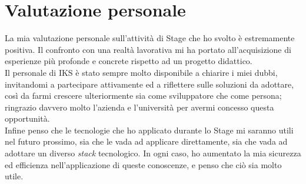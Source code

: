 \section{Valutazione personale}
La mia valutazione personale sull'attività di Stage che ho svolto è estremamente positiva. Il confronto con una realtà lavorativa mi ha portato all'acquisizione di esperienze più profonde e concrete rispetto ad un progetto didattico.\\
Il personale di IKS è stato sempre molto disponibile a chiarire i miei dubbi, invitandomi a partecipare attivamente ed a riflettere sulle soluzioni da adottare, così da farmi crescere ulteriormente sia come sviluppatore che come persona; ringrazio davvero molto l'azienda e l'università per avermi concesso questa opportunità.\\
Infine penso che le tecnologie che ho applicato durante lo Stage mi saranno utili nel futuro prossimo, sia che le vada ad applicare direttamente, sia che vada ad adottare un diverso \emph{stack} tecnologico. In ogni caso, ho aumentato la mia sicurezza  ed efficienza nell'applicazione di queste conoscenze, e penso che ciò sia molto utile.

